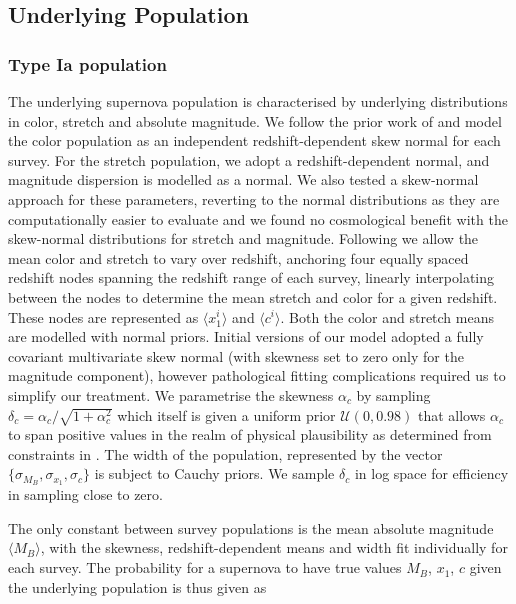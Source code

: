 \documentclass[a4paper,fleqn,usenatbib]{mnras}
\newcommand{\green}{\color{forestgreen}}
\newcommand{\rubin}{\citetalias{Rubin2015}}
\begin{document}
\subsection{Underlying Population}

\subsubsection{Type Ia population} 
\label{sec:underlying}
The underlying supernova population is characterised by underlying distributions in color, stretch and absolute magnitude. We follow the prior work of {\rubin} and model the color population as an independent redshift-dependent skew normal for each survey. For the stretch population, we adopt a redshift-dependent normal, and magnitude dispersion is modelled as a normal. {\green We also tested a skew-normal approach for these parameters, reverting to the normal distributions as they are computationally easier to evaluate and we found no cosmological benefit with the skew-normal distributions for stretch and magnitude.} Following {\rubin} we allow the mean color and stretch to vary over redshift, anchoring four equally spaced redshift nodes spanning the redshift range of each survey, linearly interpolating between the nodes to determine the mean stretch and color for a given redshift. These nodes are represented as $\langle x_1^i \rangle$ and $\langle c^i \rangle$. Both the color and stretch means are modelled with normal priors. Initial versions of our model adopted a fully covariant multivariate skew normal (with skewness set to zero only for the magnitude component), however pathological fitting complications required us to simplify our treatment. We parametrise the skewness $\alpha_c$ by sampling $\delta_c = \alpha_c / \sqrt{1 + \alpha_c^2}$ which itself is given a uniform prior $\mathcal{U}(0,0.98)$ {\green that} allows $\alpha_c$ to span positive values in the realm of physical plausibility as determined from constraints in \citet{Scolnic2016}. The width of the population, represented by the vector $\lbrace \sigma_{M_B}, \sigma_{x_1}, \sigma_c \rbrace$ is subject to Cauchy priors. We sample $\delta_c$ in log space for efficiency in sampling close to zero. 

The only constant between survey populations is the mean absolute magnitude $\langle M_B \rangle$, with the skewness, redshift-dependent means and width fit individually for each survey. The probability for a supernova to have true values $M_B$, $x_1$, $c$ given the underlying population is thus given as
\end{document}
